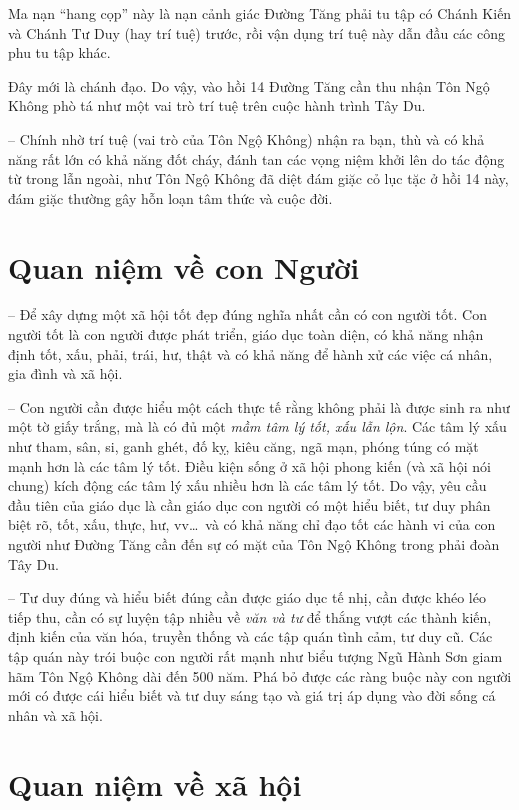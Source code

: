 Ma nạn ``hang cọp'' này là nạn cảnh giác Đường Tăng phải tu tập có Chánh Kiến và Chánh Tư Duy (hay trí tuệ) trước, rồi vận dụng trí tuệ này dẫn đầu các công phu tu tập khác.

Đây mới là chánh đạo. Do vậy, vào hồi 14 Đường Tăng cần thu nhận Tôn Ngộ Không phò tá như một vai trò trí tuệ trên cuộc hành trình Tây Du.

-- Chính nhờ trí tuệ (vai trò của Tôn Ngộ Không) nhận ra bạn, thù và có khả năng rất lớn có khả năng đốt cháy, đánh tan các vọng niệm khởi lên do tác động từ trong lẫn ngoài, như Tôn Ngộ Không đã diệt đám giặc cỏ lục tặc ở hồi 14 này, đám giặc thường gây hỗn loạn tâm thức và cuộc đời.

\section{Quan niệm về con Người} %
\label{sec:13_con_nguoi}

-- Để xây dựng một xã hội tốt đẹp đúng nghĩa nhất cần có con người tốt. Con người tốt là con người được phát triển, giáo dục toàn diện, có khả năng nhận định tốt, xấu, phải, trái, hư, thật và có khả năng để hành xử các việc cá nhân, gia đình và xã hội.

-- Con người cần được hiểu một cách thực tế rằng không phải là được sinh ra như một tờ giấy trắng, mà là có đủ một \emph{mầm tâm lý tốt, xấu lẫn lộn}. Các tâm lý xấu như tham, sân, si, ganh ghét, đố kỵ, kiêu căng, ngã mạn, phóng túng có mặt mạnh hơn là các tâm lý tốt. Điều kiện sống ở xã hội phong kiến (và xã hội nói chung) kích động các tâm lý xấu nhiều hơn là các tâm lý tốt. Do vậy, yêu cầu đầu tiên của giáo dục là cần giáo dục con người có một hiểu biết, tư duy phân biệt rõ, tốt, xấu, thực, hư, vv\ldots ~và có khả năng chỉ đạo tốt các hành vi của con người như Đường Tăng cần đến sự có mặt của Tôn Ngộ Không trong phải đoàn Tây Du.

-- Tư duy đúng và hiểu biết đúng cần được giáo dục tế nhị, cần được khéo léo tiếp thu, cần có sự luyện tập nhiều về \emph{văn và tư} để thắng vượt các thành kiến, định kiến của văn hóa, truyền thống và các tập quán tình cảm, tư duy cũ. Các tập quán này trói buộc con người rất mạnh như biểu tượng Ngũ Hành Sơn giam hãm Tôn Ngộ Không dài đến 500 năm. Phá bỏ được các ràng buộc này con người mới có được cái hiểu biết và tư duy sáng tạo và giá trị áp dụng vào đời sống cá nhân và xã hội.

\section{Quan niệm về xã hội} %
\label{sec:13_xa_hoi}


